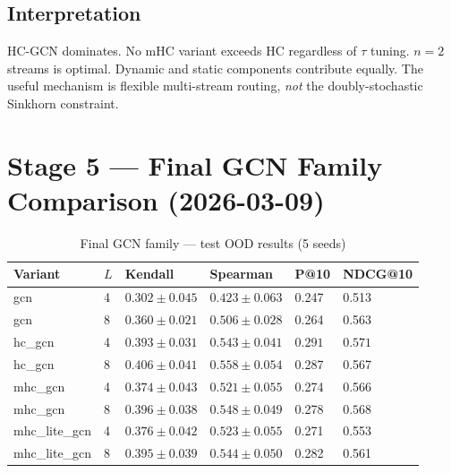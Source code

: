 \documentclass[11pt,a4paper]{article}
\begin{document}
\subsection{Interpretation}
HC-GCN dominates. No mHC variant exceeds HC regardless of $\tau$ tuning.
$n=2$ streams is optimal. Dynamic and static components contribute equally.
The useful mechanism is flexible multi-stream routing, \emph{not} the
doubly-stochastic Sinkhorn constraint.

\section{Stage 5 --- Final GCN Family Comparison (2026-03-09)}

\begin{table}[h]
\centering
\caption{Final GCN family --- test OOD results (5 seeds)}
\begin{tabular}{L{3cm} C{0.8cm} R{2.2cm} R{2.2cm} R{2.2cm} R{2.2cm}}
\toprule
Variant & $L$ & Kendall & Spearman & P@10 & NDCG@10 \\
\midrule
gcn            & 4 & $0.302\pm0.045$ & $0.423\pm0.063$ & 0.247 & 0.513 \\
gcn            & 8 & $0.360\pm0.021$ & $0.506\pm0.028$ & 0.264 & 0.563 \\
\midrule
hc\_gcn        & 4 & $0.393\pm0.031$ & $0.543\pm0.041$ & $\mathbf{0.291}$ & $\mathbf{0.571}$ \\
hc\_gcn        & 8 & $\mathbf{0.406\pm0.041}$ & $\mathbf{0.558\pm0.054}$ & 0.287 & 0.567 \\
\midrule
mhc\_gcn       & 4 & $0.374\pm0.043$ & $0.521\pm0.055$ & 0.274 & 0.566 \\
mhc\_gcn       & 8 & $0.396\pm0.038$ & $0.548\pm0.049$ & 0.278 & $\mathbf{0.568}$ \\
\midrule
mhc\_lite\_gcn & 4 & $0.376\pm0.042$ & $0.523\pm0.055$ & 0.271 & 0.553 \\
mhc\_lite\_gcn & 8 & $0.395\pm0.039$ & $0.544\pm0.050$ & 0.282 & 0.561 \\
\bottomrule
\end{tabular}
\end{table}
\end{document}
